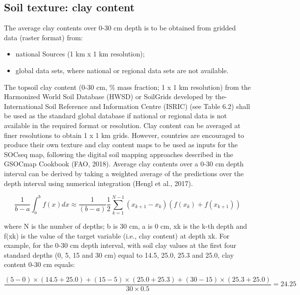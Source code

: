\documentclass[
  10pt,
  b5paper,
]{book}
\providecommand{\tightlist}{%
  \setlength{\itemsep}{0pt}\setlength{\parskip}{0pt}}
\begin{document}
\hypertarget{soil-texture-clay-content}{%
\subsection{Soil texture: clay content}\label{soil-texture-clay-content}}

The average clay contents over 0-30 cm depth is to be obtained from gridded data (raster format) from:

\begin{itemize}
\tightlist
\item
  national Sources (1 km x 1 km resolution);
\item
  global data sets, where national or regional data sets are not available.
\end{itemize}

The topsoil clay content (0-30 cm, \% mass fraction; 1 x 1 km resolution) from the Harmonized World Soil Database (HWSD) or SoilGrids developed by the- International Soil Reference and Information Centre (ISRIC) (see Table 6.2) shall be used as the standard global database if national or regional data is not available in the required format or resolution. Clay content can be averaged at finer resolutions to obtain 1 x 1 km grids. However, countries are encouraged to produce their own texture and clay content maps to be used as inputs for the SOCseq map, following the digital soil mapping approaches described in the GSOCmap Cookbook (FAO, 2018).
Average clay contents over a 0-30 cm depth interval can be derived by taking a weighted average of the predictions over the depth interval using numerical integration (Hengl et al., 2017).

\begin{equation}
\tag{6.1}
\frac{1}{b-a} \int_{a}^{b} f(x) dx \approx \frac{1}{(b-a)} \frac{1}{2} \sum_{k=1}^{N-1}(x_{k+1} - x_{k})(f(x_{k}) + f(x_{k +1})) 
\end{equation}

where N is the number of depths; b is 30 cm, a is 0 cm, xk is the k-th depth and f(xk) is the value of the target variable (i.e., clay content) at depth xk. For example, for the 0-30 cm depth interval, with soil clay values at the first four standard depths (0, 5, 15 and 30 cm) equal to 14.5, 25.0, 25.3 and 25.0, clay content 0-30 cm equals:

\begin{equation}
\tag{6.2}
    \frac{(5-0) \times(14.5+25.0)+(15-5) \times(25.0 + 25.3) + (30 - 15) \times (25.3 + 25.0)} {30\times 0.5} = 24.25
\end{equation}
\end{document}
